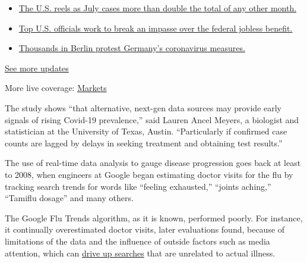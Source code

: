 \begin{itemize}
\tightlist
\item
  \href{https://www.nytimes.com/2020/08/01/world/coronavirus-covid-19.html?action=click\&pgtype=Article\&state=default\&region=MAIN_CONTENT_1\&context=storylines_live_updates\#link-34047410}{The
  U.S. reels as July cases more than double the total of any other
  month.}
\item
  \href{https://www.nytimes.com/2020/08/01/world/coronavirus-covid-19.html?action=click\&pgtype=Article\&state=default\&region=MAIN_CONTENT_1\&context=storylines_live_updates\#link-780ec966}{Top
  U.S. officials work to break an impasse over the federal jobless
  benefit.}
\item
  \href{https://www.nytimes.com/2020/08/01/world/coronavirus-covid-19.html?action=click\&pgtype=Article\&state=default\&region=MAIN_CONTENT_1\&context=storylines_live_updates\#link-25930521}{Thousands
  in Berlin protest Germany's coronavirus measures.}
\end{itemize}

\href{https://www.nytimes.com/2020/08/01/world/coronavirus-covid-19.html?action=click\&pgtype=Article\&state=default\&region=MAIN_CONTENT_1\&context=storylines_live_updates}{See
more updates}

More live coverage:
\href{https://www.nytimes.com/live/2020/07/31/business/stock-market-today-coronavirus?action=click\&pgtype=Article\&state=default\&region=MAIN_CONTENT_1\&context=storylines_live_updates}{Markets}

The study shows ``that alternative, next-gen data sources may provide
early signals of rising Covid-19 prevalence,'' said Lauren Ancel Meyers,
a biologist and statistician at the University of Texas, Austin.
``Particularly if confirmed case counts are lagged by delays in seeking
treatment and obtaining test results.''

The use of real-time data analysis to gauge disease progression goes
back at least to 2008, when engineers at Google began estimating doctor
visits for the flu by tracking search trends for words like ``feeling
exhausted,'' ``joints aching,'' ``Tamiflu dosage'' and many others.

The Google Flu Trends algorithm, as it is known, performed poorly. For
instance, it continually overestimated doctor visits, later evaluations
found, because of limitations of the data and the influence of outside
factors such as media attention, which can
\href{https://dash.harvard.edu/bitstream/handle/1/12016837/ssrn-id2408560_2.pdf?sequence=1\&isAllowed=y}{drive
up searches} that are unrelated to actual illness.

